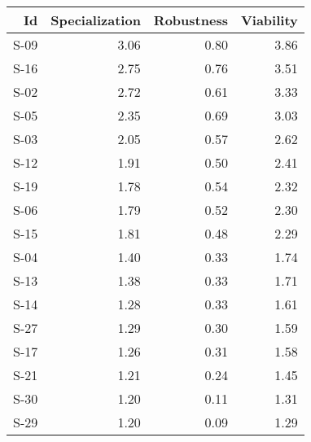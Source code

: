 

\begin{tabular}{ | r | r | r | r | }
    \hline
                    Id  &  Specialization  &      Robustness  &       Viability  \\
    \hline
    \hline
                  S-09  &            3.06  &            0.80  &            3.86  \\
    \hline
                  S-16  &            2.75  &            0.76  &            3.51  \\
    \hline
                  S-02  &            2.72  &            0.61  &            3.33  \\
    \hline
                  S-05  &            2.35  &            0.69  &            3.03  \\
    \hline
                  S-03  &            2.05  &            0.57  &            2.62  \\
    \hline
                  S-12  &            1.91  &            0.50  &            2.41  \\
    \hline
                  S-19  &            1.78  &            0.54  &            2.32  \\
    \hline
                  S-06  &            1.79  &            0.52  &            2.30  \\
    \hline
                  S-15  &            1.81  &            0.48  &            2.29  \\
    \hline
                  S-04  &            1.40  &            0.33  &            1.74  \\
    \hline
                  S-13  &            1.38  &            0.33  &            1.71  \\
    \hline
                  S-14  &            1.28  &            0.33  &            1.61  \\
    \hline
                  S-27  &            1.29  &            0.30  &            1.59  \\
    \hline
                  S-17  &            1.26  &            0.31  &            1.58  \\
    \hline
                  S-21  &            1.21  &            0.24  &            1.45  \\
    \hline
                  S-30  &            1.20  &            0.11  &            1.31  \\
    \hline
                  S-29  &            1.20  &            0.09  &            1.29  \\

\end{tabular}
